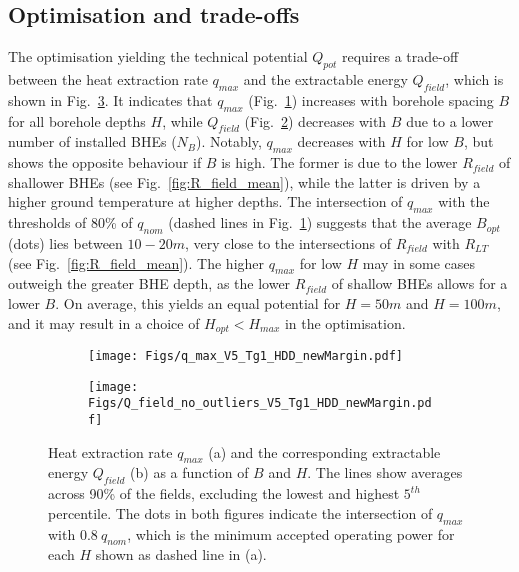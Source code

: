 \subsection{Optimisation and trade-offs}

The optimisation yielding the technical potential $Q_{pot}$ requires a trade-off between the heat extraction rate $q_{max}$ and the extractable energy $Q_{field}$, which is shown in Fig.~\ref{fig:optimisation}.
%
It indicates that $q_{max}$ (Fig.~\ref{fig:q_max}) increases with borehole spacing $B$ for all borehole depths $H$, while $Q_{field}$ (Fig.~\ref{fig:Q_field}) decreases with $B$ due to a lower number of installed BHEs ($N_B$).
Notably, $q_{max}$ decreases with $H$ for low $B$, but shows the opposite behaviour if $B$ is high.
The former is due to the lower $R_{field}$ of shallower BHEs (see Fig.~\ref{fig:R_field_mean}), while the latter is driven by a higher ground temperature at higher depths. 
%
The intersection of $q_{max}$ with the thresholds of 80\% of $q_{nom}$ (dashed lines in Fig.~\ref{fig:q_max}) suggests that the average $B_{opt}$ (dots) lies between $10-20m$, very close to the intersections of $R_{field}$ with $R_{LT}$ (see Fig.~\ref{fig:R_field_mean}). 
The higher $q_{max}$ for low $H$ may in some cases outweigh the greater BHE depth, as the lower $R_{field}$ of shallow BHEs allows for a lower $B$. 
On average, this yields an equal potential for $H = 50m$ and $H = 100m$, and it may result in a choice of $H_{opt} < H_{max}$ in the optimisation.


\begin{figure}[ht!]
\centering
\begin{subfigure}{.49\textwidth}
  \centering
  \texttt{[image: Figs/q\_max\_V5\_Tg1\_HDD\_newMargin.pdf]} 
  \subcaption{}
  \label{fig:q_max}
\end{subfigure}
\begin{subfigure}{.49\textwidth}
  \centering
  \texttt{[image: Figs/Q\_field\_no\_outliers\_V5\_Tg1\_HDD\_newMargin.pdf]} 
  \subcaption{}
  \label{fig:Q_field}
\end{subfigure}

\caption{Heat extraction rate $q_{max}$ (a) and  the corresponding extractable energy $Q_{field}$ (b) as a function of $B$ and $H$. 
The lines show averages across 90\% of the fields, excluding the lowest and highest $5^{th}$ percentile.
The dots in both figures indicate the intersection of $q_{max}$ with $0.8 \ q_{nom}$, which is the minimum accepted operating power for each $H$ shown as dashed line in (a).}
\label{fig:optimisation}
\end{figure}

